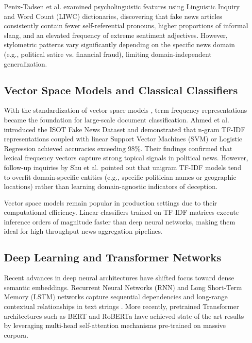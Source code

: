 \documentclass[conference]{IEEEtran}
\begin{document}
Penix-Tadsen et al. \cite{penix2018} examined psycholinguistic features using Linguistic Inquiry and Word Count (LIWC) dictionaries, discovering that fake news articles consistently contain fewer self-referential pronouns, higher proportions of informal slang, and an elevated frequency of extreme sentiment adjectives. However, stylometric patterns vary significantly depending on the specific news domain (e.g., political satire vs. financial fraud), limiting domain-independent generalization.

\subsection{Vector Space Models and Classical Classifiers}
With the standardization of vector space models \cite{salton1988}, term frequency representations became the foundation for large-scale document classification. Ahmed et al. \cite{isotpaper} introduced the ISOT Fake News Dataset and demonstrated that n-gram TF-IDF representations coupled with linear Support Vector Machines (SVM) or Logistic Regression achieved accuracies exceeding 98\%. Their findings confirmed that lexical frequency vectors capture strong topical signals in political news. However, follow-up inquiries by Shu et al. \cite{shu2017} pointed out that unigram TF-IDF models tend to overfit domain-specific entities (e.g., specific politician names or geographic locations) rather than learning domain-agnostic indicators of deception.

Vector space models remain popular in production settings due to their computational efficiency. Linear classifiers trained on TF-IDF matrices execute inference orders of magnitude faster than deep neural networks, making them ideal for high-throughput news aggregation pipelines.

\subsection{Deep Learning and Transformer Networks}
Recent advances in deep neural architectures have shifted focus toward dense semantic embeddings. Recurrent Neural Networks (RNN) and Long Short-Term Memory (LSTM) networks capture sequential dependencies and long-range contextual relationships in text strings \cite{hochreiter1997}. More recently, pretrained Transformer architectures such as BERT \cite{devlin2019} and RoBERTa \cite{liu2019} have achieved state-of-the-art results by leveraging multi-head self-attention mechanisms pre-trained on massive corpora.
\end{document}
